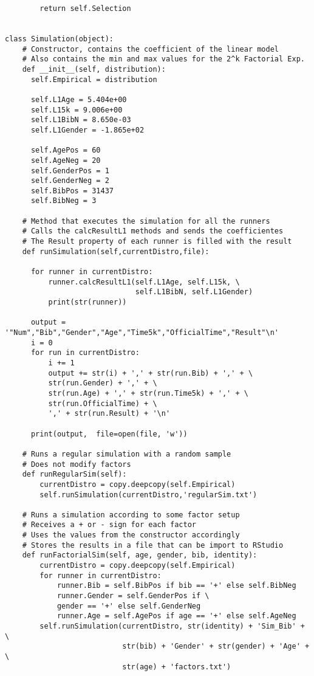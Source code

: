 \documentclass[11pt, oneside]{article}   	%
\begin{document}
\begin{lstlisting}
        return self.Selection
        

class Simulation(object):
    # Constructor, contains the coefficient of the linear model
    # Also contains the min and max values for the 2^k Factorial Exp.
    def __init__(self, distribution):
      self.Empirical = distribution
      
      self.L1Age = 5.404e+00
      self.L15k = 9.006e+00
      self.L1BibN = 8.650e-03
      self.L1Gender = -1.865e+02
      
      self.AgePos = 60
      self.AgeNeg = 20
      self.GenderPos = 1
      self.GenderNeg = 2
      self.BibPos = 31437
      self.BibNeg = 3

    # Method that executes the simulation for all the runners
    # Calls the calcResultL1 methods and sends the coefficientes
    # The Result property of each runner is filled with the result
    def runSimulation(self,currentDistro,file):
      
      for runner in currentDistro:
          runner.calcResultL1(self.L1Age, self.L15k, \
                              self.L1BibN, self.L1Gender)
          print(str(runner))
      
      output = '"Num","Bib","Gender","Age","Time5k","OfficialTime","Result"\n'
      i = 0
      for run in currentDistro:
          i += 1
          output += str(i) + ',' + str(run.Bib) + ',' + \
          str(run.Gender) + ',' + \
          str(run.Age) + ',' + str(run.Time5k) + ',' + \
          str(run.OfficialTime) + \
          ',' + str(run.Result) + '\n'
            
      print(output,  file=open(file, 'w'))
    
    # Runs a regular simulation with a random sample
    # Does not modify factors
    def runRegularSim(self):
        currentDistro = copy.deepcopy(self.Empirical)
        self.runSimulation(currentDistro,'regularSim.txt')
   
    # Runs a simulation according to some factor setup
    # Receives a + or - sign for each factor
    # Uses the values from the constructor accordingly
    # Stores the results in a file that can be import to RStudio
    def runFactorialSim(self, age, gender, bib, identity):
        currentDistro = copy.deepcopy(self.Empirical)
        for runner in currentDistro:
            runner.Bib = self.BibPos if bib == '+' else self.BibNeg
            runner.Gender = self.GenderPos if \
            gender == '+' else self.GenderNeg
            runner.Age = self.AgePos if age == '+' else self.AgeNeg
        self.runSimulation(currentDistro, str(identity) + 'Sim_Bib' + \
                           str(bib) + 'Gender' + str(gender) + 'Age' + \
                           str(age) + 'factors.txt')
        

\end{lstlisting}
\end{document}
